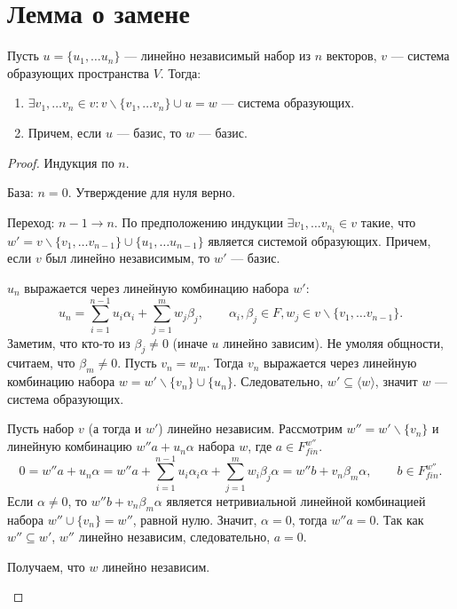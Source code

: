 \documentclass[11pt]{book}
\theoremstyle{definition}
\theoremstyle{plain}
\theoremstyle{plain}
\theoremstyle{definition}
\theoremstyle{remark}
\begin{document}
\section{Лемма о замене}
\begin{thm}\label{lm_zam}
    Пусть $ u = \{u_1, \ldots u_n\}$ --- линейно  независимый набор из  $ n$ векторов, $ v$ --- система образующих пространства  $ V$.
    Тогда:
    \begin{enumerate}[noitemsep]
	\item $ \exists v_1, \ldots v_n \in v: v \smallsetminus \{v_1, \ldots v_n\} \cup u = w$ --- система образующих.
	\item Причем, если  $ u$ --- базис, то $ w$ --- базис.
    \end{enumerate}
\end{thm}
\begin{proof}
    Индукция по $ n$.
    \begin{description}
	\item База: $ n = 0$.  Утверждение для нуля верно.
	\item Переход:  $ n-1 \to  n$. По предположению индукции $ \exists v_1, \ldots v_{n_i} \in v$ такие, что $ w' = v \smallsetminus \{v_1, \ldots v_{n-1}\} \cup \{u_1, \ldots u_{n-1}\}$ является системой образующих. Причем, если $ v$ был линейно независимым, то  $ w'$ --- базис.

	    $ u_n$ выражается через линейную комбинацию набора  $ w'$:  \[
		u_n =	      \sum_{i=1}^{n-1} u_i \alpha_i + \sum _{j=1}^{m} w_{j}\beta_j, \qquad \alpha_i, \beta_j \in F, w_j \in v \smallsetminus \{v_1, \ldots v_{n-1}\}
	    .\]
	    Заметим, что кто-то из $ \beta_j \ne 0$ (иначе $ u$ линейно зависим).
	    Не умоляя общности, считаем, что $ \beta_m \ne 0$.  Пусть $ v_n = w_m$. Тогда  $ v_n$ выражается через линейную комбинацию набора  $ w = w' \smallsetminus \{v_n\} \cup \{u_n\}$. Следовательно, $ w' \subseteq \langle w \rangle$, значит $ w$ --- система образующих.

	    Пусть набор  $ v$ (а тогда и  $ w'$) линейно независим. Рассмотрим  $ w'' = w' \smallsetminus \{v_n\}$ и линейную комбинацию $ w'' a + u_n \alpha $ набора  $ w$, где  $ a \in F_{fin}^{w''}$.
	    \[
		0 = w'' a + u_n \alpha = w''a + \sum _{i=1}^{n-1} u_i \alpha_i \alpha + \sum _{j= 1}^{m} w_i \beta_j \alpha = w'' b + v_n \beta_m \alpha, \qquad b \in F_{fin}^{w''}
	    .\]
	    Если $ \alpha \ne 0$, то $ w''b + v_n \beta_m \alpha$ является нетривиальной линейной комбинацией набора  $ w'' \cup \{v_n\} = w''$, равной нулю. Значит,  $ \alpha =0$, тогда $ w''a = 0$. Так как  $ w'' \subseteq w'$, $ w''$ линейно независим, следовательно,  $ a = 0$.

	    Получаем, что  $ w$  линейно независим.
    \end{description}
\end{proof}
\end{document}
